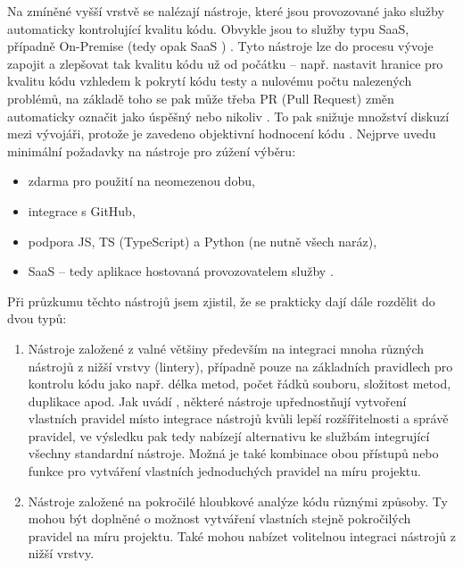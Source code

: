 Na zmíněné vyšší vrstvě se nalézají nástroje, které jsou provozované jako služby automaticky kontrolující kvalitu kódu. Obvykle jsou to služby typu SaaS, případně On-Premise (tedy opak SaaS \cite{globema-onpremise}) \cite{codebeat-engines}. Tyto nástroje lze do procesu vývoje zapojit a zlepšovat tak kvalitu kódu už od počátku -- např. nastavit hranice pro kvalitu kódu vzhledem k pokrytí kódu testy a nulovému počtu nalezených problémů, na základě toho se pak může třeba PR (Pull Request) změn automaticky označit jako úspěšný nebo nikoliv \cite{medium-devgurus}. To pak snižuje množství diskuzí mezi vývojáři, protože je zavedeno objektivní hodnocení kódu \cite{medium-devgurus}. Nejprve uvedu minimální požadavky na nástroje pro zúžení výběru:
\begin{itemize}
    \item zdarma pro použití na neomezenou dobu,
    \item integrace s GitHub,
    \item podpora JS, TS (TypeScript) a Python (ne nutně všech naráz),
    \item SaaS -- tedy aplikace hostovaná provozovatelem služby \cite{oracle-saas}.
\end{itemize}

Při průzkumu těchto nástrojů jsem zjistil, že se prakticky dají dále rozdělit do dvou typů:
\begin{enumerate}
    \item Nástroje založené z valné většiny především na integraci mnoha různých nástrojů z nižší vrstvy (lintery), případně pouze na základních pravidlech pro kontrolu kódu jako např. délka metod, počet řádků souboru, složitost metod, duplikace apod. Jak uvádí \cite{globema-onpremise}, některé nástroje upřednostňují vytvoření vlastních pravidel místo integrace nástrojů kvůli lepší rozšířitelnosti a správě pravidel, ve výsledku pak tedy nabízejí alternativu ke službám integrující všechny standardní nástroje. Možná je také kombinace obou přístupů nebo funkce pro vytváření vlastních jednoduchých pravidel na míru projektu.
    \item Nástroje založené na pokročilé hloubkové analýze kódu různými způsoby. Ty mohou být doplněné o možnost vytváření vlastních stejně pokročilých pravidel na míru projektu. Také mohou nabízet volitelnou integraci nástrojů z nižší vrstvy.
\end{enumerate}

